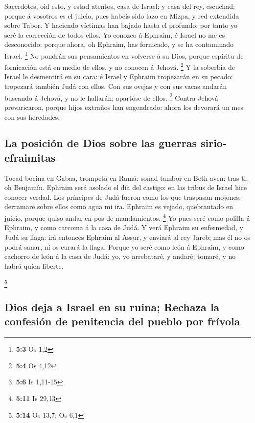 Sacerdotes, oid esto, y estad atentos, casa de Israel; y
casa del rey, escuchad: porque á vosotros es el juicio, pues habéis sido
lazo en Mizpa, y red extendida sobre Tabor.  Y haciendo
víctimas han bajado hasta el profundo: por tanto yo seré la corrección
de todos ellos.  Yo conozco á Ephraim, é Israel no me es
desconocido: porque ahora, oh Ephraim, has fornicado, y se ha
contaminado Israel. \footnote{\textbf{5:3} Os 1,2}  No
pondrán sus pensamientos en volverse á su Dios, porque espíritu de
fornicación está en medio de ellos, y no conocen á Jehová. \footnote{\textbf{5:4}
  Os 4,12}  Y la soberbia de Israel le desmentirá en su
cara: é Israel y Ephraim tropezarán en su pecado: tropezará también Judá
con ellos.  Con sus ovejas y con sus vacas andarán
buscando á Jehová, y no le hallarán; apartóse de ellos. \footnote{\textbf{5:6}
  Is 1,11-15}  Contra Jehová prevaricaron, porque hijos
extraños han engendrado: ahora los devorará un mes con sus heredades.

\hypertarget{la-posiciuxf3n-de-dios-sobre-las-guerras-sirio-efraimitas}{%
\subsection{La posición de Dios sobre las guerras
sirio-efraimitas}\label{la-posiciuxf3n-de-dios-sobre-las-guerras-sirio-efraimitas}}

 Tocad bocina en Gabaa, trompeta en Ramá: sonad tambor en
Beth-aven: tras ti, oh Benjamín.  Ephraim será asolado el
día del castigo: en las tribus de Israel hice conocer verdad.
 Los príncipes de Judá fueron como los que traspasan
mojones: derramaré sobre ellos como agua mi ira.  Ephraim
es vejado, quebrantado en juicio, porque quiso andar en pos de
mandamientos. \footnote{\textbf{5:11} Is 29,13}  Yo pues
seré como polilla á Ephraim, y como carcoma á la casa de Judá.
 Y verá Ephraim su enfermedad, y Judá su llaga: irá
entonces Ephraim al Assur, y enviará al rey Jareb; mas él no os podrá
sanar, ni os curará la llaga.  Porque yo seré como león á
Ephraim, y como cachorro de león á la casa de Judá: yo, yo arrebataré, y
andaré; tomaré, y no habrá quien liberte.

\footnote{\textbf{5:14} Os 13,7; Os 6,1}

\hypertarget{dios-deja-a-israel-en-su-ruina-rechaza-la-confesiuxf3n-de-penitencia-del-pueblo-por-fruxedvola}{%
\subsection{Dios deja a Israel en su ruina; Rechaza la confesión de
penitencia del pueblo por
frívola}\label{dios-deja-a-israel-en-su-ruina-rechaza-la-confesiuxf3n-de-penitencia-del-pueblo-por-fruxedvola}}

